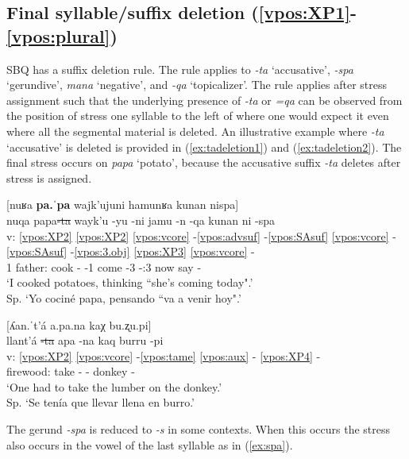 \documentclass[output=paper]{langscibook}
\begin{document}
\subsection{Final syllable/suffix deletion (\ref{vpos:XP1}-\ref{vpos:plural})}

\label{sec:suffixdeletion}

SBQ has a suffix deletion rule. The rule applies to \textit{-ta} `accusative', \textit{-spa} `gerundive', \textit{mana} `negative', and \textit{-qa} `topicalizer'. The rule applies after stress assignment such that the underlying presence of \textit{-ta} or \textit{=qa} can be observed from the position of stress one syllable to the left of where one would expect it even where all the segmental material is deleted. An illustrative example where \textit{-ta} `accusative' is deleted is provided in (\ref{ex:tadeletion1}) and (\ref{ex:tadeletion2}). The final stress occurs on \textit{papa} `potato', because the accusative suffix \textit{-ta} deletes after stress is assigned. 

\ea \label{ex:tadeletion1}
    [nuʁa \textbf{pa.ˈpa} wajk'ujuni hamunʁa kunan nispa] \\
    \glll{} nuqa papa\sout{-ta} wayk'u -yu -ni jamu -n -qa kunan ni -spa \\ 
    v: \ref{vpos:XP2} \ref{vpos:XP2} \ref{vpos:vcore} -\ref{vpos:advsuf} -\ref{vpos:SAsuf} \ref{vpos:vcore} -\ref{vpos:SAsuf} -\ref{vpos:3.obj}  \ref{vpos:XP3} \ref{vpos:vcore} - \\
    {} 1\Sg{} father:\Acc{} cook -\Cmpl{} -1 come -3 -\Fut{}:3 now say -\Gerund{} \\
    \glt `I cooked potatoes, thinking ``she's coming today".' \\ Sp. `Yo cociné papa, pensando ``va a venir hoy".'
\z 

\ea \label{ex:tadeletion2}
    [ʎan.ˈt'á a.pa.na kaχ bu.ʐu.pi\downarrow] \\
    \glll {} llant'á \sout{-ta} apa -na kaq burru -pi \\
    v: \ref{vpos:XP2} \ref{vpos:vcore} -\ref{vpos:tame} \ref{vpos:aux} - \ref{vpos:XP4} -   \\
    {} firewood:\Acc{} take -\Imp{} \Aux{}-\Hab{} donkey -\Loc{} \\
    \glt `One had to take the lumber on the donkey.' \\ Sp. `Se tenía que llevar llena en burro.'
\z 

The gerund \textit{-spa} is reduced to \textit{-s} in some contexts. When this occurs the stress also occurs in the vowel of the last syllable as in (\ref{ex:spa}).
\end{document}
